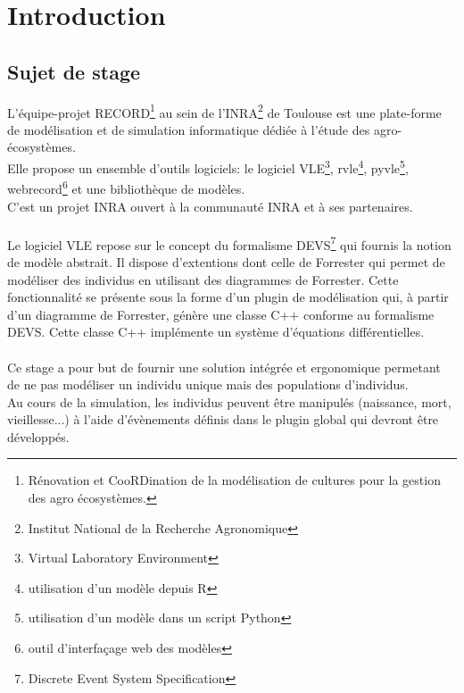 \chapter{Introduction}
\setlength{\parskip}{2.5ex plus .4ex minus .4ex}
\section{Sujet de stage}
L'équipe-projet RECORD\footnote{Rénovation et CooRDination de la modélisation de cultures pour la
gestion des agro écosystèmes.} au sein de l'INRA\footnote{Institut National de la Recherche Agronomique} de Toulouse est une plate-forme de modélisation et de simulation informatique dédiée à l'étude des agro-écosystèmes.\\
Elle propose un ensemble d'outils logiciels: le logiciel VLE\footnote{Virtual Laboratory Environment}, rvle\footnote{utilisation d'un modèle depuis R}, pyvle\footnote{utilisation d'un modèle dans un script Python}, webrecord\footnote{outil d'interfaçage web des modèles} et une bibliothèque de modèles.\\
C'est un projet INRA ouvert à la communauté INRA et à ses partenaires.\\
\\
Le logiciel VLE repose sur le concept du formalisme DEVS\footnote{Discrete Event System Specification} qui fournis la notion de modèle abstrait. Il dispose d'extentions dont celle de Forrester qui permet de modéliser des individus en utilisant des diagrammes de Forrester. Cette fonctionnalité se présente sous la forme d'un plugin de modélisation qui, à partir d'un diagramme de Forrester, génère une classe C++ conforme au formalisme DEVS. Cette classe C++ implémente un système d'équations différentielles.\\
\\
Ce stage a pour but de fournir une solution intégrée et ergonomique permetant de ne pas modéliser un individu unique mais des populations d'individus.\\
Au cours de la simulation, les individus peuvent être manipulés (naissance, mort, vieillesse...) à l'aide d'évènements définis dans le plugin global qui devront être développés.

